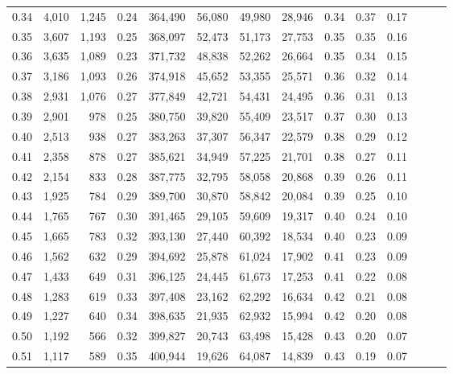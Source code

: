\begin{tabular}{rrrrrrrrrrrrrr}
0.34 &   4,010 &  1,245 &  0.24 &  364,490 &   56,080 &  49,980 &  28,946 &  0.34 &  0.37 &      0.17 \\
0.35 &   3,607 &  1,193 &  0.25 &  368,097 &   52,473 &  51,173 &  27,753 &  0.35 &  0.35 &      0.16 \\
0.36 &   3,635 &  1,089 &  0.23 &  371,732 &   48,838 &  52,262 &  26,664 &  0.35 &  0.34 &      0.15 \\
0.37 &   3,186 &  1,093 &  0.26 &  374,918 &   45,652 &  53,355 &  25,571 &  0.36 &  0.32 &      0.14 \\
0.38 &   2,931 &  1,076 &  0.27 &  377,849 &   42,721 &  54,431 &  24,495 &  0.36 &  0.31 &      0.13 \\
0.39 &   2,901 &    978 &  0.25 &  380,750 &   39,820 &  55,409 &  23,517 &  0.37 &  0.30 &      0.13 \\
0.40 &   2,513 &    938 &  0.27 &  383,263 &   37,307 &  56,347 &  22,579 &  0.38 &  0.29 &      0.12 \\
0.41 &   2,358 &    878 &  0.27 &  385,621 &   34,949 &  57,225 &  21,701 &  0.38 &  0.27 &      0.11 \\
0.42 &   2,154 &    833 &  0.28 &  387,775 &   32,795 &  58,058 &  20,868 &  0.39 &  0.26 &      0.11 \\
0.43 &   1,925 &    784 &  0.29 &  389,700 &   30,870 &  58,842 &  20,084 &  0.39 &  0.25 &      0.10 \\
0.44 &   1,765 &    767 &  0.30 &  391,465 &   29,105 &  59,609 &  19,317 &  0.40 &  0.24 &      0.10 \\
0.45 &   1,665 &    783 &  0.32 &  393,130 &   27,440 &  60,392 &  18,534 &  0.40 &  0.23 &      0.09 \\
0.46 &   1,562 &    632 &  0.29 &  394,692 &   25,878 &  61,024 &  17,902 &  0.41 &  0.23 &      0.09 \\
0.47 &   1,433 &    649 &  0.31 &  396,125 &   24,445 &  61,673 &  17,253 &  0.41 &  0.22 &      0.08 \\
0.48 &   1,283 &    619 &  0.33 &  397,408 &   23,162 &  62,292 &  16,634 &  0.42 &  0.21 &      0.08 \\
0.49 &   1,227 &    640 &  0.34 &  398,635 &   21,935 &  62,932 &  15,994 &  0.42 &  0.20 &      0.08 \\
0.50 &   1,192 &    566 &  0.32 &  399,827 &   20,743 &  63,498 &  15,428 &  0.43 &  0.20 &      0.07 \\
0.51 &   1,117 &    589 &  0.35 &  400,944 &   19,626 &  64,087 &  14,839 &  0.43 &  0.19 &      0.07 \\

\end{tabular}
